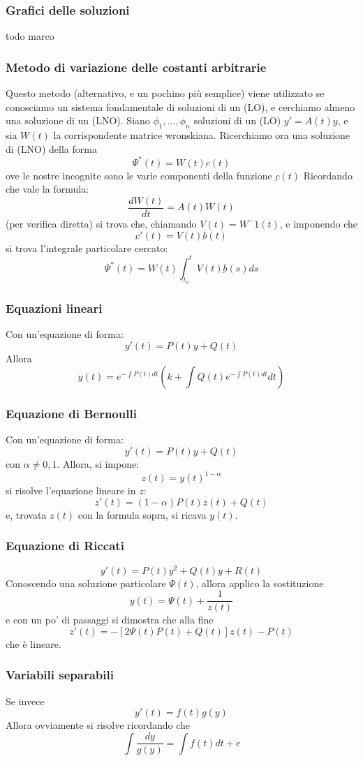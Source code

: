 \documentclass[a4paper,12pt]{article}
\begin{document}
\subsubsection{Grafici delle soluzioni}
todo marco
\subsubsection{Metodo di variazione delle costanti arbitrarie}
Questo metodo (alternativo, e un pochino più semplice) viene utilizzato se conosciamo un sistema fondamentale di soluzioni di un (LO), e cerchiamo almeno una soluzione di un (LNO).
Siano $\phi_1,...,\phi_n$ soluzioni di un (LO) $y'= A(t)y$, e sia $W(t)$ la corrispondente matrice wronskiana.
Ricerchiamo ora una soluzione di (LNO) della forma
$$\Psi^*(t)=W(t)\underbar{c}(t)$$
ove le nostre incognite sono le varie componenti della funzione $\underbar{c}(t)$
Ricordando che vale la formula:
$$\frac{dW(t)}{dt} = A(t)W(t)$$
(per verifica diretta) si trova che, chiamando $V(t) = W^-1(t)$, e imponendo che $$\underbar{c}'(t) = V(t)\underbar{b}(t)$$
si trova l'integrale particolare cercato:
$$\Psi^*(t)= W(t)\int_{t_0}^t V(t)\underbar{b}(s) ds$$

\subsubsection{Equazioni lineari}
Con un'equazione di forma:
$$y'(t) = P(t)y+Q(t)$$
Allora
$$y(t)=e^{- \displaystyle\int P(t)dt}\left(k + \int Q(t)e^{-\displaystyle\int P(t)dt}dt\right)$$
\subsubsection{Equazione di Bernoulli}
Con un'equazione di forma:
$$y'(t) = P(t)y+Q(t)$$
con $\alpha \neq 0, 1$. Allora, si impone:
$$ z(t)=y(t)^{1-\alpha} $$
si risolve l'equazione lineare in $z$: $$z'(t)=(1-\alpha)P(t)z(t)+Q(t)$$ e, trovata $z(t)$ con la formula sopra, si ricava $y(t)$.

\subsubsection{Equazione di Riccati}
$$y'(t) = P(t)y^2+Q(t)y+R(t)$$
Conoscendo una soluzione particolare $\Psi(t)$, allora applico la sostituzione
$$y(t)=\Psi(t)+\dfrac{1}{z(t)}$$
e con un po' di passaggi si dimostra che alla fine
$$z'(t)= -\left[2\Psi(t)P(t)+Q(t)\right]z(t)-P(t)$$
che è lineare.
\subsubsection{Variabili separabili}
Se invece
$$y'(t) = f(t)g(y)$$
Allora ovviamente si risolve ricordando che
$$\int\dfrac{dy}{g(y)}=\int f(t)dt + c$$
\end{document}
